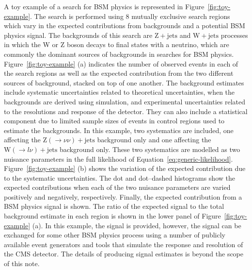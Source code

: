 A toy example of a search for BSM physics is represented in Figure~\ref{fig:toy-example}. The search is performed using 8 mutually exclusive search regions 
which vary in the expected contributions from backgrounds and a potential BSM physics signal. The backgrounds of this search are $\mathrm{Z+jets}$ and $\mathrm{W+jets}$ processes in which the 
W or Z boson decays to final states with a neutrino, which are commonly the dominant sources of backgrounds in searches for BSM physics. Figure~\ref{fig:toy-example} (a) indicates the 
number of observed events in each of the search regions as well as the expected contribution from the two different sources of background, stacked on top of one another. 
The background estimates include systematic uncertainties related to theoretical uncertainties, when the backgrounds are derived using 
simulation, and experimental uncertainties related to the resolutions and response of the detector. They can also include a statistical component 
due to limited sample sizes of events in control regions used to estimate the backgrounds. In this example, two systematics are included, one affecting the $\mathrm{Z}(\rightarrow \nu\nu)+\mathrm{jets}$ background only
and one affecting the $\mathrm{W}(\rightarrow l\nu)+\mathrm{jets}$ background only. These two systematics are modelled as two nuisance parameters in the full likelihood of Equation~\ref{eq:generic-likelihood}. 
Figure~\ref{fig:toy-example} (b) shows the variation of the expected contribution due to the systematic uncertainties. 
The dot and dot--dashed histograms show the expected 
contributions when each of the two nuisance parameters are varied positively and negatively, respectively.
Finally, the expected contribution from a BSM physics signal is shown. 
The ratio of the expected signal to the total background estimate in each region is shown in the lower panel of Figure~\ref{fig:toy-example} (a). 
In this example, the signal is provided, however, the 
signal can be exchanged for some other BSM physics process using a number of publicly available event generators and tools that simulate the response 
and resolution of the CMS detector. The details of producing signal estimates is beyond the scope of this note. 

